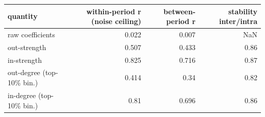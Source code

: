 \begin{tabular}{lrrr}
\toprule
quantity & within-period r (noise ceiling) & between-period r & stability inter/intra \\
\midrule
raw coefficients & 0.022 & 0.007 & NaN \\
out-strength & 0.507 & 0.433 & 0.86 \\
in-strength & 0.825 & 0.716 & 0.87 \\
out-degree (top-10\% bin.) & 0.414 & 0.34 & 0.82 \\
in-degree (top-10\% bin.) & 0.81 & 0.696 & 0.86 \\
\bottomrule
\end{tabular}
